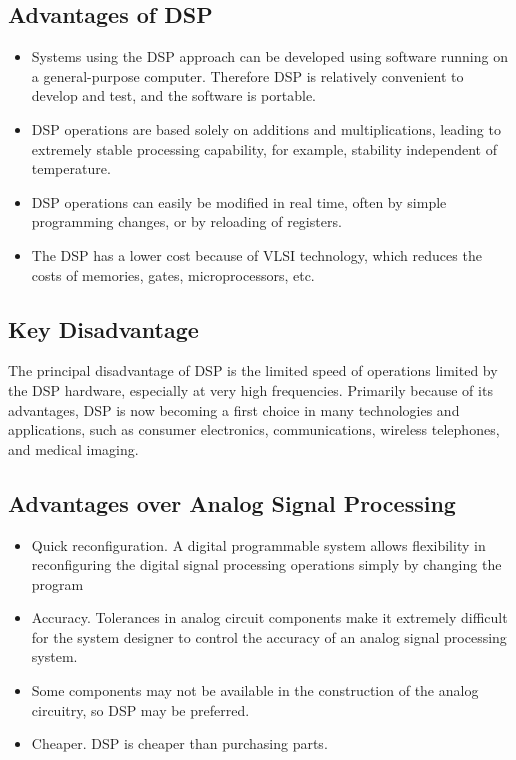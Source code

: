 \documentclass{article}
\begin{document}
\newpage
\subsection{Advantages of DSP}

\begin{itemize}
    \item  Systems using the DSP approach can be developed using software running on a general-purpose computer. Therefore DSP is relatively convenient to develop and test, and the software is portable.
    \item DSP operations are based solely on additions and multiplications, leading to extremely stable processing capability, for example, stability independent of temperature.
    \item DSP operations can easily be modified in real time, often by simple
    programming changes, or by reloading of registers.
    \item The DSP has a lower cost because of VLSI technology, which reduces the costs of memories, gates, microprocessors, etc.
\end{itemize}
\subsection{Key Disadvantage}
The principal disadvantage of DSP is the limited speed of operations
limited by the DSP hardware, especially at very high frequencies. Primarily because of its advantages, DSP is now becoming a first choice in many
technologies and applications, such as consumer electronics, communications, wireless telephones, and medical imaging.

\subsection{Advantages over Analog Signal Processing}
\begin{itemize}
    \item Quick reconfiguration. A digital programmable system allows flexibility in reconfiguring the
digital signal processing operations simply by changing the program
    \item Accuracy. Tolerances in analog circuit components make it extremely
difficult for the system designer to control the accuracy of an analog signal processing system. 
    \item Some components may not be available in the construction of the analog circuitry, so DSP may be preferred. 
    \item Cheaper. DSP is cheaper than purchasing parts. 
\end{itemize}
\end{document}
